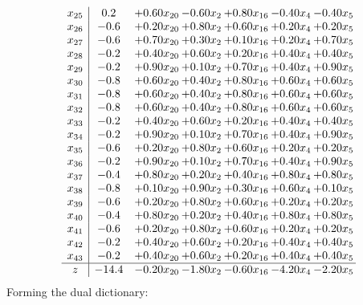 \documentclass[8pt]{article}
\begin{document}
\[\begin{array}{c| c c@{\hskip 2pt} c@{\hskip 2pt} c@{\hskip 2pt} c@{\hskip 2pt} c@{\hskip 2pt} }
 x_{25}   &  0.2 & +  0.60 x_{20} & -0.60 x_{2} & +  0.80 x_{16} & -0.40 x_{4} & -0.40 x_{5}\\
 x_{26}   &  -0.6 & +  0.20 x_{20} & +  0.80 x_{2} & +  0.60 x_{16} & +  0.20 x_{4} & +  0.20 x_{5}\\
 x_{27}   &  -0.6 & +  0.70 x_{20} & +  0.30 x_{2} & +  0.10 x_{16} & +  0.20 x_{4} & +  0.70 x_{5}\\
 x_{28}   &  -0.2 & +  0.40 x_{20} & +  0.60 x_{2} & +  0.20 x_{16} & +  0.40 x_{4} & +  0.40 x_{5}\\
 x_{29}   &  -0.2 & +  0.90 x_{20} & +  0.10 x_{2} & +  0.70 x_{16} & +  0.40 x_{4} & +  0.90 x_{5}\\
 x_{30}   &  -0.8 & +  0.60 x_{20} & +  0.40 x_{2} & +  0.80 x_{16} & +  0.60 x_{4} & +  0.60 x_{5}\\
 x_{31}   &  -0.8 & +  0.60 x_{20} & +  0.40 x_{2} & +  0.80 x_{16} & +  0.60 x_{4} & +  0.60 x_{5}\\
 x_{32}   &  -0.8 & +  0.60 x_{20} & +  0.40 x_{2} & +  0.80 x_{16} & +  0.60 x_{4} & +  0.60 x_{5}\\
 x_{33}   &  -0.2 & +  0.40 x_{20} & +  0.60 x_{2} & +  0.20 x_{16} & +  0.40 x_{4} & +  0.40 x_{5}\\
 x_{34}   &  -0.2 & +  0.90 x_{20} & +  0.10 x_{2} & +  0.70 x_{16} & +  0.40 x_{4} & +  0.90 x_{5}\\
 x_{35}   &  -0.6 & +  0.20 x_{20} & +  0.80 x_{2} & +  0.60 x_{16} & +  0.20 x_{4} & +  0.20 x_{5}\\
 x_{36}   &  -0.2 & +  0.90 x_{20} & +  0.10 x_{2} & +  0.70 x_{16} & +  0.40 x_{4} & +  0.90 x_{5}\\
 x_{37}   &  -0.4 & +  0.80 x_{20} & +  0.20 x_{2} & +  0.40 x_{16} & +  0.80 x_{4} & +  0.80 x_{5}\\
 x_{38}   &  -0.8 & +  0.10 x_{20} & +  0.90 x_{2} & +  0.30 x_{16} & +  0.60 x_{4} & +  0.10 x_{5}\\
 x_{39}   &  -0.6 & +  0.20 x_{20} & +  0.80 x_{2} & +  0.60 x_{16} & +  0.20 x_{4} & +  0.20 x_{5}\\
 x_{40}   &  -0.4 & +  0.80 x_{20} & +  0.20 x_{2} & +  0.40 x_{16} & +  0.80 x_{4} & +  0.80 x_{5}\\
 x_{41}   &  -0.6 & +  0.20 x_{20} & +  0.80 x_{2} & +  0.60 x_{16} & +  0.20 x_{4} & +  0.20 x_{5}\\
 x_{42}   &  -0.2 & +  0.40 x_{20} & +  0.60 x_{2} & +  0.20 x_{16} & +  0.40 x_{4} & +  0.40 x_{5}\\
 x_{43}   &  -0.2 & +  0.40 x_{20} & +  0.60 x_{2} & +  0.20 x_{16} & +  0.40 x_{4} & +  0.40 x_{5}\\
\hline
z    &  -14.4 & -0.20 x_{20} & -1.80 x_{2} & -0.60 x_{16} & -4.20 x_{4} & -2.20 x_{5}\\
\end{array}\]
Forming the dual dictionary:
\end{document}
